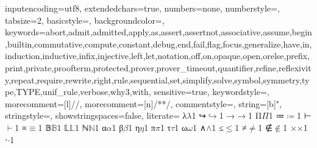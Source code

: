 
{
  inputencoding=utf8,
  extendedchars=true,
  numbers=none,
  numberstyle={},
  tabsize=2,
  basicstyle={\ttfamily\small\upshape},
  backgroundcolor=\color{lightgrey},
  keywords={abort,admit,admitted,apply,as,assert,assertnot,associative,assume,begin,builtin,commutative,compute,constant,debug,end,fail,flag,focus,generalize,have,in,induction,inductive,infix,injective,left,let,notation,off,on,opaque,open,orelse,prefix,print,private,proofterm,protected,prover,prover_timeout,quantifier,refine,reflexivity,repeat,require,rewrite,right,rule,sequential,set,simplify,solve,symbol,symmetry,type,TYPE,unif_rule,verbose,why3,with},
  sensitive=true,
  keywordstyle=\color{blue},
  morecomment=[l]{//},
  morecomment=[n]{/*}{*/},
  commentstyle={\itshape\color{red}},
  string=[b]{"},
  stringstyle=\color{orange},
  showstringspaces=false,
  literate=
  {λ}{$\lambda$}1
  {↪}{$\hookrightarrow$}1
  {→}{$\rightarrow$}1
  {Π}{$\Pi$}1
  {≔}{$\coloneqq$}1
  {⊢}{$\vdash$}1
  {≡}{$\equiv$}1
  {𝔹}{$\mathbb{B}$}1
  {𝕃}{$\mathbb{L}$}1
  {ℕ}{$\mathbb{N}$}1
  {α}{$\alpha$}1
  {β}{$\beta$}1
  {η}{$\eta$}1
  {π}{$\pi$}1
  {τ}{$\tau$}1
  {ω}{$\omega$}1
  {∧}{$\wedge$}1
  {≤}{$\le$}1
  {≠}{$\neq$}1
  {∉}{$\notin$}1
  {×}{$\times$}1
  {⋅}{$\cdot$}1
}
